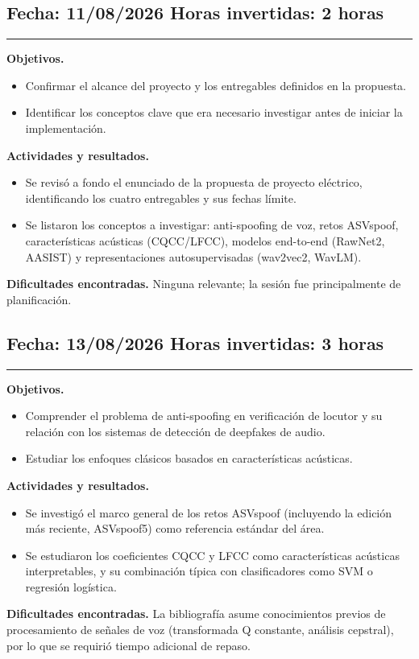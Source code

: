 \documentclass[11pt]{article}
\newenvironment{sesion}[2]{%
  \subsection*{Fecha: #1 \hfill Horas invertidas: #2}
  \vspace{-0.3cm}
  \hrule
  \vspace{0.3cm}
}{\vspace{0.5cm}}
\newcommand{\campo}[1]{\textbf{#1}}
\begin{document}
\begin{sesion}{11/08/2026}{2 horas}
\campo{Objetivos.}
\begin{itemize}
\item Confirmar el alcance del proyecto y los entregables definidos en la propuesta.
\item Identificar los conceptos clave que era necesario investigar antes de iniciar la implementación.
\end{itemize}
\campo{Actividades y resultados.}
\begin{itemize}
\item Se revisó a fondo el enunciado de la propuesta de proyecto eléctrico, identificando los cuatro entregables y sus fechas límite.
\item Se listaron los conceptos a investigar: anti-spoofing de voz, retos ASVspoof, características acústicas (CQCC/LFCC), modelos end-to-end (RawNet2, AASIST) y representaciones autosupervisadas (wav2vec2, WavLM).
\end{itemize}
\campo{Dificultades encontradas.} Ninguna relevante; la sesión fue principalmente de planificación.
\end{sesion}

\begin{sesion}{13/08/2026}{3 horas}
\campo{Objetivos.}
\begin{itemize}
\item Comprender el problema de anti-spoofing en verificación de locutor y su relación con los sistemas de detección de deepfakes de audio.
\item Estudiar los enfoques clásicos basados en características acústicas.
\end{itemize}
\campo{Actividades y resultados.}
\begin{itemize}
\item Se investigó el marco general de los retos ASVspoof (incluyendo la edición más reciente, ASVspoof5) como referencia estándar del área.
\item Se estudiaron los coeficientes CQCC y LFCC como características acústicas interpretables, y su combinación típica con clasificadores como SVM o regresión logística.
\end{itemize}
\campo{Dificultades encontradas.} La bibliografía asume conocimientos previos de procesamiento de señales de voz (transformada Q constante, análisis cepstral), por lo que se requirió tiempo adicional de repaso.
\end{sesion}
\end{document}
